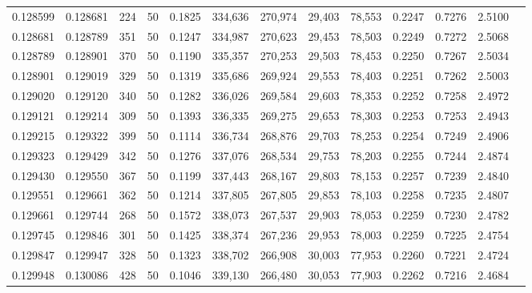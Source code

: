 \begin{tabular}{rrrrrrrrrrrrr}
0.128599 & 0.128681 &   224 &  50 &                                     0.1825 & 334,636 & 270,974 &  29,403 &  78,553 & 0.2247 & 0.7276 & 2.5100 \\
0.128681 & 0.128789 &   351 &  50 &                                     0.1247 & 334,987 & 270,623 &  29,453 &  78,503 & 0.2249 & 0.7272 & 2.5068 \\
0.128789 & 0.128901 &   370 &  50 &                                     0.1190 & 335,357 & 270,253 &  29,503 &  78,453 & 0.2250 & 0.7267 & 2.5034 \\
0.128901 & 0.129019 &   329 &  50 &                                     0.1319 & 335,686 & 269,924 &  29,553 &  78,403 & 0.2251 & 0.7262 & 2.5003 \\
0.129020 & 0.129120 &   340 &  50 &                                     0.1282 & 336,026 & 269,584 &  29,603 &  78,353 & 0.2252 & 0.7258 & 2.4972 \\
0.129121 & 0.129214 &   309 &  50 &                                     0.1393 & 336,335 & 269,275 &  29,653 &  78,303 & 0.2253 & 0.7253 & 2.4943 \\
0.129215 & 0.129322 &   399 &  50 &                                     0.1114 & 336,734 & 268,876 &  29,703 &  78,253 & 0.2254 & 0.7249 & 2.4906 \\
0.129323 & 0.129429 &   342 &  50 &                                     0.1276 & 337,076 & 268,534 &  29,753 &  78,203 & 0.2255 & 0.7244 & 2.4874 \\
0.129430 & 0.129550 &   367 &  50 &                                     0.1199 & 337,443 & 268,167 &  29,803 &  78,153 & 0.2257 & 0.7239 & 2.4840 \\
0.129551 & 0.129661 &   362 &  50 &                                     0.1214 & 337,805 & 267,805 &  29,853 &  78,103 & 0.2258 & 0.7235 & 2.4807 \\
0.129661 & 0.129744 &   268 &  50 &                                     0.1572 & 338,073 & 267,537 &  29,903 &  78,053 & 0.2259 & 0.7230 & 2.4782 \\
0.129745 & 0.129846 &   301 &  50 &                                     0.1425 & 338,374 & 267,236 &  29,953 &  78,003 & 0.2259 & 0.7225 & 2.4754 \\
0.129847 & 0.129947 &   328 &  50 &                                     0.1323 & 338,702 & 266,908 &  30,003 &  77,953 & 0.2260 & 0.7221 & 2.4724 \\
0.129948 & 0.130086 &   428 &  50 &                                     0.1046 & 339,130 & 266,480 &  30,053 &  77,903 & 0.2262 & 0.7216 & 2.4684 \\

\end{tabular}
